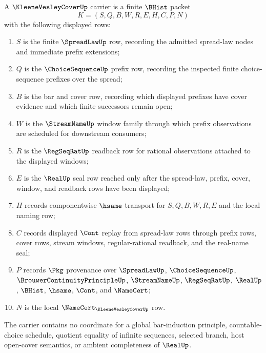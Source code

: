 \begin{definition}
\label{def:kleene-vesley-cover-carrier}
A $\KleeneVesleyCoverUp$ carrier is a finite $\BHist$ packet
$$
K=(S,Q,B,W,R,E,H,C,P,N)
$$
with the following displayed rows:
\begin{enumerate}
\item $S$ is the finite $\SpreadLawUp$ row, recording the admitted spread-law nodes and immediate prefix extensions;
\item $Q$ is the $\ChoiceSequenceUp$ prefix row, recording the inspected finite choice-sequence prefixes over the spread;
\item $B$ is the bar and cover row, recording which displayed prefixes have cover evidence and which finite successors remain open;
\item $W$ is the $\StreamNameUp$ window family through which prefix observations are scheduled for downstream consumers;
\item $R$ is the $\RegSeqRatUp$ readback row for rational observations attached to the displayed windows;
\item $E$ is the $\RealUp$ seal row reached only after the spread-law, prefix, cover, window, and readback rows have been displayed;
\item $H$ records componentwise $\hsame$ transport for $S,Q,B,W,R,E$ and the local naming row;
\item $C$ records displayed $\Cont$ replay from spread-law rows through prefix rows, cover rows, stream windows, regular-rational readback, and the real-name seal;
\item $P$ records $\Pkg$ provenance over $\SpreadLawUp$, $\ChoiceSequenceUp$, $\BrouwerContinuityPrincipleUp$, $\StreamNameUp$, $\RegSeqRatUp$, $\RealUp$, $\BHist$, $\hsame$, $\Cont$, and $\NameCert$;
\item $N$ is the local $\NameCert_{\KleeneVesleyCoverUp}$ row.
\end{enumerate}
The carrier contains no coordinate for a global bar-induction principle, countable-choice schedule, quotient equality of infinite sequences, selected branch, host open-cover semantics, or ambient completeness of $\RealUp$.
\end{definition}

